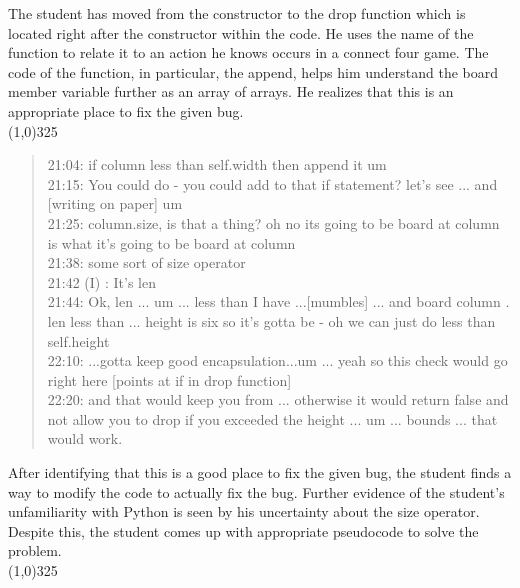 \documentclass{article}
\begin{document}
The student has moved from the constructor to the drop function which is located right after the constructor within the code. He uses the name of the function to relate it to an action he knows occurs in a connect four game. The code of the function, in particular, the append, helps him understand the board member variable further as an array of arrays. He realizes that this is an appropriate place to fix the given bug.  \\
\line(1,0){325}
\begin{quote}
21:04: if column less than self.width then append it um \\
21:15: You could do - you could add to that if statement? let's see ... and [writing on paper] um \\
21:25: column.size, is that a thing? oh no its going to be board at column is what it's going to be board at column\\
21:38: some sort of size operator\\
21:42 (I) : It's len\\
21:44: Ok, len ... um ... less than  I have ...[mumbles] ... and board column . len less than ... height is six so it's gotta be - oh we can just do less than self.height\\
22:10: ...gotta keep good encapsulation...um ... yeah so this check would go right here [points at if in drop function]\\
22:20: and that would keep you from ... otherwise it would return false and not allow you to drop if you exceeded the height ... um ... bounds ... that would work.\\
\end{quote}

After identifying that this is a good place to fix the given bug, the student finds a way to modify the code to actually fix the bug. Further evidence of the student's unfamiliarity with Python is seen by his uncertainty about the size operator. Despite this, the student comes up with appropriate pseudocode to solve the problem. \\
\line(1,0){325}
\newpage
\end{document}
